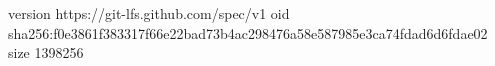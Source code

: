 version https://git-lfs.github.com/spec/v1
oid sha256:f0e3861f383317f66e22bad73b4ac298476a58e587985e3ca74fdad6d6fdae02
size 1398256
